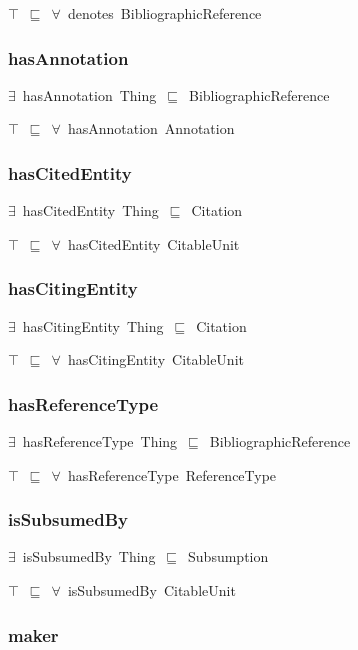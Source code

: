 \documentclass{article}
\begin{document}
\ensuremath{\top}~\ensuremath{\sqsubseteq}~\ensuremath{\forall}~denotes~BibliographicReference

\subsubsection*{hasAnnotation}

\ensuremath{\exists}~hasAnnotation~Thing~\ensuremath{\sqsubseteq}~BibliographicReference

\ensuremath{\top}~\ensuremath{\sqsubseteq}~\ensuremath{\forall}~hasAnnotation~Annotation

\subsubsection*{hasCitedEntity}

\ensuremath{\exists}~hasCitedEntity~Thing~\ensuremath{\sqsubseteq}~Citation

\ensuremath{\top}~\ensuremath{\sqsubseteq}~\ensuremath{\forall}~hasCitedEntity~CitableUnit

\subsubsection*{hasCitingEntity}

\ensuremath{\exists}~hasCitingEntity~Thing~\ensuremath{\sqsubseteq}~Citation

\ensuremath{\top}~\ensuremath{\sqsubseteq}~\ensuremath{\forall}~hasCitingEntity~CitableUnit

\subsubsection*{hasReferenceType}

\ensuremath{\exists}~hasReferenceType~Thing~\ensuremath{\sqsubseteq}~BibliographicReference

\ensuremath{\top}~\ensuremath{\sqsubseteq}~\ensuremath{\forall}~hasReferenceType~ReferenceType

\subsubsection*{isSubsumedBy}

\ensuremath{\exists}~isSubsumedBy~Thing~\ensuremath{\sqsubseteq}~Subsumption

\ensuremath{\top}~\ensuremath{\sqsubseteq}~\ensuremath{\forall}~isSubsumedBy~CitableUnit

\subsubsection*{maker}
\end{document}

